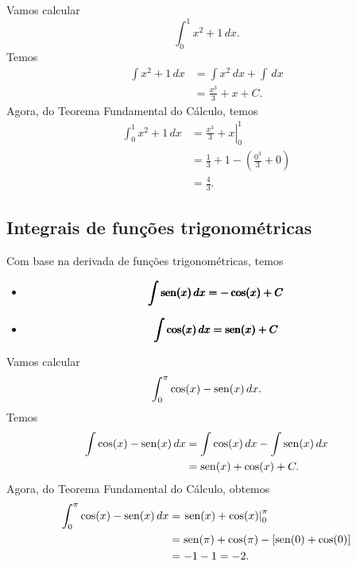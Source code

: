 \begin{ex}
  Vamos calcular
  \begin{equation}
    \int_{0}^1 x^2 + 1\,dx.
  \end{equation}
  Temos
  \begin{align}
    \int x^2 + 1\,dx &= \int x^2\,dx + \int \,dx\\
                     &= \frac{x^3}{3} + x + C.
  \end{align}
  Agora, do Teorema Fundamental do Cálculo, temos
  \begin{align}
    \int_0^1 x^2+1\,dx &= \left. \frac{x^3}{3} + x\right|_0^1 \\
                       &= \frac{1}{3} + 1 - \left(\frac{0^3}{3} + 0\right) \\
                       &= \frac{4}{3}.
  \end{align}
\end{ex}

\subsection{Integrais de funções trigonométricas}

Com base na derivada de funções trigonométricas, temos
\begin{itemize}
\item
  \begin{equation}
    \pmb{\int \operatorname{sen}(x)\,dx = -\cos(x) + C}
  \end{equation}
\item
  \begin{equation}
    \pmb{\int \cos(x)\,dx = \operatorname{sen}(x) + C}
  \end{equation}
\end{itemize}

\begin{ex}
  Vamos calcular
  \begin{equation}
    \int_0^{\pi} \cos(x) - \operatorname{sen}(x)\,dx.
  \end{equation}
  Temos
  \begin{align}
    \int \cos(x)-\operatorname{sen}(x)\,dx &= \int\cos(x)\,dx - \int\operatorname{sen}(x)\,dx\\
                             &= \operatorname{sen}(x) + \cos(x) + C.
  \end{align}
  Agora, do Teorema Fundamental do Cálculo, obtemos
  \begin{align}
    \int_0^{\pi} \cos(x)-\operatorname{sen}(x)\,dx &= \left.\operatorname{sen}(x) + \cos(x)\right|_0^\pi \\
                             &= \operatorname{sen}(\pi)+\cos(\pi) - \left[\operatorname{sen}(0)+\cos(0)\right]\\
                             &= -1 - 1 = -2.
  \end{align}
\end{ex}

